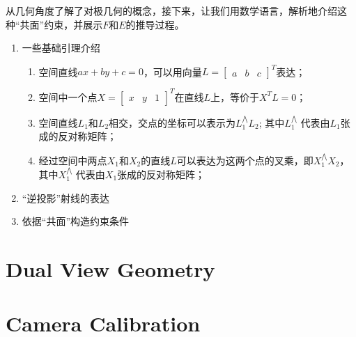 从几何角度了解了对极几何的概念，接下来，让我们用数学语言，解析地介绍这种“共面”约束，并展示$F$和$E$的推导过程。
\begin{enumerate}
\item 一些基础引理介绍
	\begin{enumerate}
		\item 空间直线$ax+by+c=0$，可以用向量$L = \left[ \begin{array}{ccc} a & b & c \end{array} \right]^{T}$表达；
		\item 空间中一个点$X=  \left[ \begin{array}{ccc} x & y & 1 \end{array} \right]^{T}$在直线$L$上，等价于$X^{T}L=0$；
		\item 空间直线$L_1$和$L_2$相交，交点的坐标可以表示为$L_1^{\bigwedge} L_2$; 其中$L_1^{\bigwedge}$ 代表由$L_1$张成的反对称矩阵；
		\item 经过空间中两点$X_1$和$X_2$的直线$L$可以表达为这两个点的叉乘，即$X_1^{\bigwedge} X_2$，其中$X_1^{\bigwedge}$ 代表由$X_1$张成的反对称矩阵；
	\end{enumerate}


\item “逆投影”射线的表达
\item 依据“共面”构造约束条件
\end{enumerate}
\section{Dual View Geometry}
\section{Camera Calibration}


